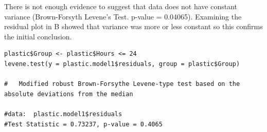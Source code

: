 \documentclass[11pt]{article}
\begin{document}
There is not enough evidence to suggest that data does not have constant
variance (Brown-Forsyth Levene's Test. p-value = 0.04065). Examining the
residual plot in B showed that variance was more or less constant so this
confirms the initial conclusion.

\begin{verbatim}
plastic$Group <- plastic$Hours <= 24
levene.test(y = plastic.model1$residuals, group = plastic$Group)

#	Modified robust Brown-Forsythe Levene-type test based on the absolute deviations from the median

#data:  plastic.model1$residuals
#Test Statistic = 0.73237, p-value = 0.4065
\end{verbatim}
\end{document}
